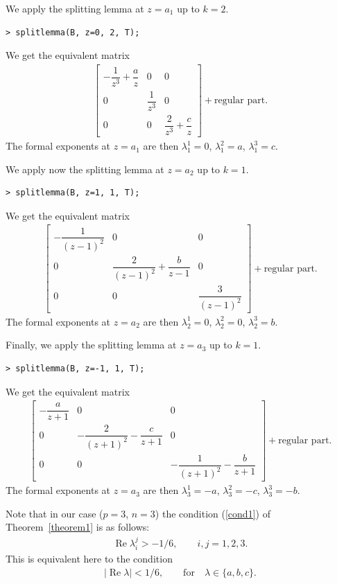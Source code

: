 \documentclass[pdftex]{sigma}
\numberwithin{equation}{section}
\begin{document}
\begin{Example}
We apply the splitting lemma at $z=a_1$ up to $k=2$.
\begin{verbatim}
> splitlemma(B, z=0, 2, T);
\end{verbatim}
We get the equivalent matrix
\begin{gather*}
\left[ \begin{matrix} -\dfrac1{z^3}+\dfrac az&0&0\\ 0&\dfrac1{z^3}&0\\ 0&0&\dfrac2{z^3}+
\dfrac cz\end{matrix} \right]+\mbox{regular part}.
\end{gather*}
The formal exponents at $z=a_1$ are then $\lambda_1^1=0$, $\lambda_1^2=a$, $\lambda_1^3=c$.
\medskip

We apply now the splitting lemma at $z=a_2$ up to $k=1$.
\begin{verbatim}
> splitlemma(B, z=1, 1, T);
\end{verbatim}
We get the equivalent matrix
\begin{gather*}
\left[ \begin{matrix} -\dfrac1{(z-1)^2}&0&0
\\ 0&\dfrac2{(z-1)^2}+\dfrac b{z-1}&0
\\ 0&0&\dfrac3{(z-1)^2}\end{matrix}
\right]+\mbox{regular part}.
\end{gather*}
The formal exponents at $z=a_2$ are then $\lambda_2^1=0$, $\lambda_2^2=0$, $\lambda_2^3=b$.

Finally, we apply the splitting lemma at $z=a_3$ up to $k=1$.
\begin{verbatim}
> splitlemma(B, z=-1, 1, T);
\end{verbatim}
We get the equivalent matrix
\begin{gather*}
\left[ \begin{matrix} - \dfrac {a}{z+1} &0&0\\ 0
&-\dfrac2{(z+1)^2}-\dfrac c{z+1}&0\\ 0
&0&-\dfrac1{(z+1)^2}-\dfrac b{z+1}\end{matrix} \right]+\mbox{regular part}.
\end{gather*}
The formal exponents at $z=a_3$ are then $\lambda_3^1=-a$, $\lambda_3^2=-c$, $\lambda_3^3=-b$.

Note that in our case ($p=3$, $n=3$) the condition (\ref{cond1}) of Theorem~\ref{theorem1} is as follows:
\begin{gather*}
\operatorname{Re}\lambda_i^j>-1/6, \qquad i,j=1,2,3.
\end{gather*}
This is equivalent here to the condition
\begin{gather*}
|\operatorname{Re}\lambda|<1/6, \qquad \mbox{for} \quad \lambda \in \{a,b,c\}.
\end{gather*}


\end{Example}
\end{document}
